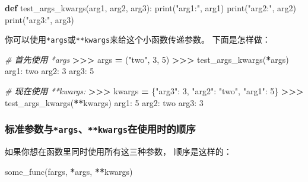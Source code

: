 \documentclass[]{ctexbook}
\newenvironment{Shaded}{\begin{snugshade}}{\end{snugshade}}
\newcommand{\BuiltInTok}[1]{#1}
\newcommand{\CommentTok}[1]{\textcolor[rgb]{0.56,0.35,0.01}{\textit{#1}}}
\newcommand{\DecValTok}[1]{\textcolor[rgb]{0.00,0.00,0.81}{#1}}
\newcommand{\KeywordTok}[1]{\textcolor[rgb]{0.13,0.29,0.53}{\textbf{#1}}}
\newcommand{\NormalTok}[1]{#1}
\newcommand{\OperatorTok}[1]{\textcolor[rgb]{0.81,0.36,0.00}{\textbf{#1}}}
\newcommand{\StringTok}[1]{\textcolor[rgb]{0.31,0.60,0.02}{#1}}
\begin{document}
\begin{Shaded}
\begin{Highlighting}[]
\KeywordTok{def}\NormalTok{ test_args_kwargs(arg1, arg2, arg3):}
    \BuiltInTok{print}\NormalTok{(}\StringTok{"arg1:"}\NormalTok{, arg1)}
    \BuiltInTok{print}\NormalTok{(}\StringTok{"arg2:"}\NormalTok{, arg2)}
    \BuiltInTok{print}\NormalTok{(}\StringTok{"arg3:"}\NormalTok{, arg3)}
\end{Highlighting}
\end{Shaded}

你可以使用\texttt{*args}或\texttt{**kwargs}来给这个小函数传递参数。 下面是怎样做：

\begin{Shaded}
\begin{Highlighting}[]
\CommentTok{# 首先使用 *args}
\OperatorTok{>>>}\NormalTok{ args }\OperatorTok{=}\NormalTok{ (}\StringTok{"two"}\NormalTok{, }\DecValTok{3}\NormalTok{, }\DecValTok{5}\NormalTok{)}
\OperatorTok{>>>}\NormalTok{ test_args_kwargs(}\OperatorTok{*}\NormalTok{args)}
\NormalTok{arg1: two}
\NormalTok{arg2: }\DecValTok{3}
\NormalTok{arg3: }\DecValTok{5}

\CommentTok{# 现在使用 **kwargs:}
\OperatorTok{>>>}\NormalTok{ kwargs }\OperatorTok{=}\NormalTok{ \{}\StringTok{"arg3"}\NormalTok{: }\DecValTok{3}\NormalTok{, }\StringTok{"arg2"}\NormalTok{: }\StringTok{"two"}\NormalTok{, }\StringTok{"arg1"}\NormalTok{: }\DecValTok{5}\NormalTok{\}}
\OperatorTok{>>>}\NormalTok{ test_args_kwargs(}\OperatorTok{**}\NormalTok{kwargs)}
\NormalTok{arg1: }\DecValTok{5}
\NormalTok{arg2: two}
\NormalTok{arg3: }\DecValTok{3}
\end{Highlighting}
\end{Shaded}

\hypertarget{ux6807ux51c6ux53c2ux6570ux4e0eargskwargsux5728ux4f7fux7528ux65f6ux7684ux987aux5e8f}{%
\subsubsection{\texorpdfstring{标准参数与\texttt{*args}、\texttt{**kwargs}在使用时的顺序}{标准参数与*args、**kwargs在使用时的顺序}}\label{ux6807ux51c6ux53c2ux6570ux4e0eargskwargsux5728ux4f7fux7528ux65f6ux7684ux987aux5e8f}}

如果你想在函数里同时使用所有这三种参数， 顺序是这样的：

\begin{Shaded}
\begin{Highlighting}[]
\NormalTok{some_func(fargs, }\OperatorTok{*}\NormalTok{args, }\OperatorTok{**}\NormalTok{kwargs)}
\end{Highlighting}
\end{Shaded}
\end{document}
